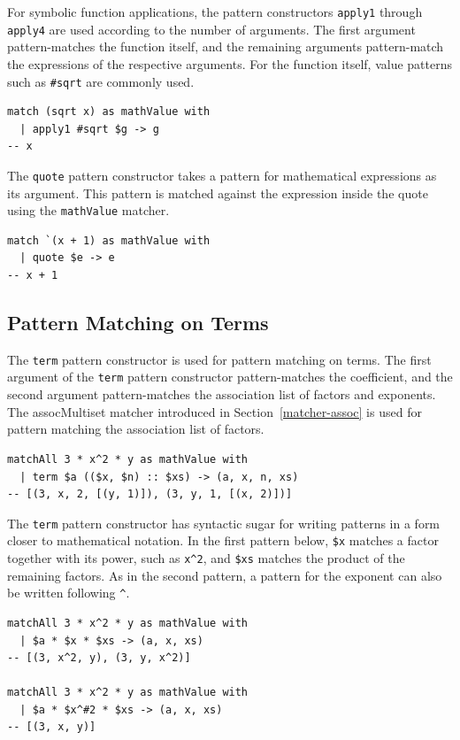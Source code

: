 For symbolic function applications, the pattern constructors \lstinline{apply1} through \lstinline{apply4} are used according to the number of arguments.
The first argument pattern-matches the function itself, and the remaining arguments pattern-match the expressions of the respective arguments.
For the function itself, value patterns such as \lstinline{#sqrt} are commonly used.
\begin{lstlisting}[language=egison,numbers=none]
match (sqrt x) as mathValue with
  | apply1 #sqrt $g -> g
-- x
\end{lstlisting}

The \lstinline{quote} pattern constructor takes a pattern for mathematical expressions as its argument.
This pattern is matched against the expression inside the quote using the \lstinline{mathValue} matcher.
\begin{lstlisting}[language=egison,numbers=none,escapechar=']
match `(x + 1) as mathValue with
  | quote $e -> e
-- x + 1
\end{lstlisting}


\subsection{Pattern Matching on Terms}

The \lstinline{term} pattern constructor is used for pattern matching on terms.
The first argument of the \lstinline{term} pattern constructor pattern-matches the coefficient, and the second argument pattern-matches the association list of factors and exponents.
The assocMultiset matcher introduced in Section~\ref{matcher-assoc} is used for pattern matching the association list of factors.
\begin{lstlisting}[language=egison,numbers=none]
matchAll 3 * x^2 * y as mathValue with
  | term $a (($x, $n) :: $xs) -> (a, x, n, xs)
-- [(3, x, 2, [(y, 1)]), (3, y, 1, [(x, 2)])]
\end{lstlisting}

The \lstinline{term} pattern constructor has syntactic sugar for writing patterns in a form closer to mathematical notation.
In the first pattern below, \lstinline{$x} matches a factor together with its power, such as \lstinline{x^2}, and \lstinline{$xs} matches the product of the remaining factors.
As in the second pattern, a pattern for the exponent can also be written following \lstinline{^}.
\begin{lstlisting}[language=egison,numbers=none]
matchAll 3 * x^2 * y as mathValue with
  | $a * $x * $xs -> (a, x, xs)
-- [(3, x^2, y), (3, y, x^2)]

matchAll 3 * x^2 * y as mathValue with
  | $a * $x^#2 * $xs -> (a, x, xs)
-- [(3, x, y)]
\end{lstlisting}

